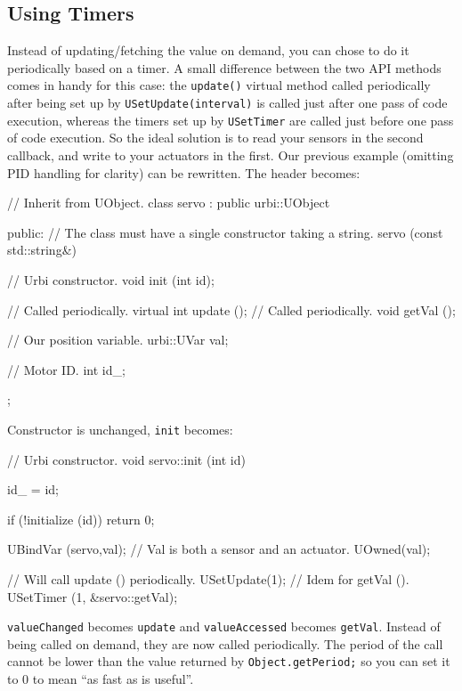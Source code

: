 \subsection{Using Timers}

Instead of updating/fetching the value on demand, you can chose to do
it periodically based on a timer. A small difference between the two
API methods comes in handy for this case: the \lstinline{update()}
virtual method called periodically after being set up by
\lstinline{USetUpdate(interval)} is called just after one pass of
\urbi code execution, whereas the timers set up by
\lstinline{USetTimer} are called just before one pass of \urbi code
execution. So the ideal solution is to read your sensors in the second
callback, and write to your actuators in the first. Our previous
example (omitting PID handling for clarity) can be rewritten. The
header becomes:

\begin{cxx}
// Inherit from UObject.
class servo : public urbi::UObject
{
public:
  // The class must have a single constructor taking a string.
  servo (const std::string&)

  // Urbi constructor.
  void init (int id);

  // Called periodically.
  virtual int update ();
  // Called periodically.
  void getVal ();

  // Our position variable.
  urbi::UVar val;

  // Motor ID.
  int id_;
};
\end{cxx}

Constructor is unchanged, \lstinline{init} becomes:

\begin{cxx}
// Urbi constructor.
void
servo::init (int id)
{
  id_ = id;

  if (!initialize (id))
    return 0;

  UBindVar (servo,val);
  // Val is both a sensor and an actuator.
  UOwned(val);

  // Will call update () periodically.
  USetUpdate(1);
  // Idem for getVal ().
  USetTimer (1, &servo::getVal);
}
\end{cxx}

\lstinline{valueChanged} becomes \lstinline{update} and
\lstinline{valueAccessed} becomes \lstinline{getVal}. Instead of being
called on demand, they are now called periodically. The period of the
call cannot be lower than the value returned by
\lstinline{Object.getPeriod;}
so you can set it to 0 to mean ``as fast as is useful''.


